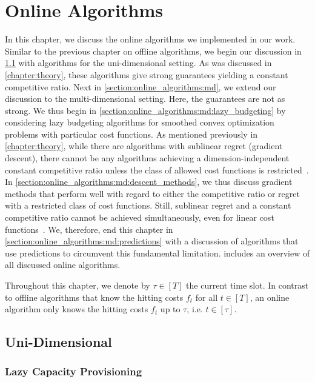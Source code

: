 
\chapter{Online Algorithms}\label{chapter:online_algorithms}

In this chapter, we discuss the online algorithms we implemented in our work. Similar to the previous chapter on offline algorithms, we begin our discussion in \cref{section:online_algorithms:ud} with algorithms for the uni-dimensional setting. As was discussed in \cref{chapter:theory}, these algorithms give strong guarantees yielding a constant competitive ratio. Next in \cref{section:online_algorithms:md}, we extend our discussion to the multi-dimensional setting. Here, the guarantees are not as strong. We thus begin in \cref{section:online_algorithms:md:lazy_budgeting} by considering lazy budgeting algorithms for smoothed convex optimization problems with particular cost functions. As mentioned previously in \cref{chapter:theory}, while there are algorithms with sublinear regret (gradient descent), there cannot be any algorithms achieving a dimension-independent constant competitive ratio unless the class of allowed cost functions is restricted~\cite{Chen2018}. In \cref{section:online_algorithms:md:descent_methods}, we thus discuss gradient methods that perform well with regard to either the competitive ratio or regret with a restricted class of cost functions. Still, sublinear regret and a constant competitive ratio cannot be achieved simultaneously, even for linear cost functions~\cite{Andrew2015}. We, therefore, end this chapter in \cref{section:online_algorithms:md:predictions} with a discussion of algorithms that use predictions to circumvent this fundamental limitation.  includes an overview of all discussed online algorithms.

Throughout this chapter, we denote by $\tau \in [T]$ the current time slot. In contrast to offline algorithms that know the hitting costs $f_t$ for all $t \in [T]$, an online algorithm only knows the hitting costs $f_t$ up to $\tau$, i.e. $t \in [\tau]$.

\section{Uni-Dimensional}\label{section:online_algorithms:ud}

\subsection{Lazy Capacity Provisioning}\label{section:online_algorithms:ud:lazy_capacity_provisioning}

